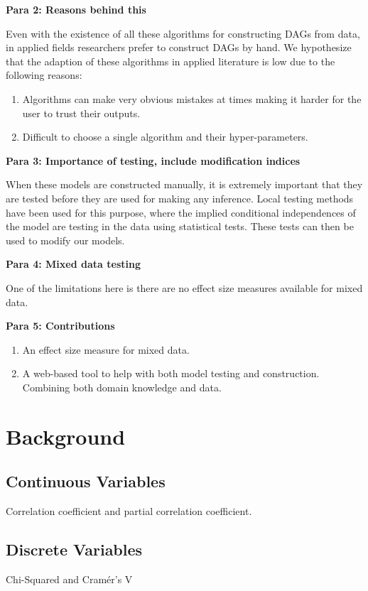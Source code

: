 \documentclass{article}
\begin{document}
\textbf{Para 2: Reasons behind this}

Even with the existence of all these algorithms for constructing DAGs from
data, in applied fields researchers prefer to construct DAGs by hand. We
hypothesize that the adaption of these algorithms in applied literature is
low due to the following reasons:
\begin{enumerate}
	\item Algorithms can make very obvious mistakes at times making it harder
		for the user to trust their outputs.
	\item Difficult to choose a single algorithm and their hyper-parameters.
\end{enumerate}

\textbf{Para 3: Importance of testing, include modification indices}

When these models are constructed manually, it is extremely important that they
are tested before they are used for making any inference. Local testing methods
have been used for this purpose, where the implied conditional independences of
the model are testing in the data using statistical tests. These tests can then
be used to modify our models.

\textbf{Para 4: Mixed data testing}

One of the limitations here is there are no effect size measures available for mixed data.

\textbf{Para 5: Contributions}
\begin{enumerate}
	\item An effect size measure for mixed data. 
	\item A web-based tool to help with both model testing and construction. Combining both domain knowledge and data.
\end{enumerate}


\section{Background}

\subsection{Continuous Variables}
Correlation coefficient and partial correlation coefficient.

\subsection{Discrete Variables}
Chi-Squared and Cram\'er's V
\end{document}
